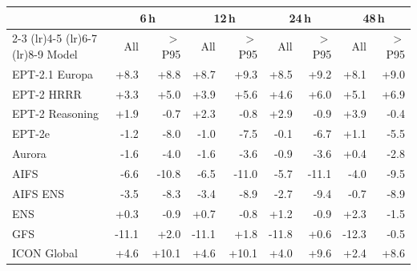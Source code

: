 \begin{tabular}{@{}l*{8}{r}@{}}
\toprule
& \multicolumn{2}{c}{6\,h} & \multicolumn{2}{c}{12\,h} & \multicolumn{2}{c}{24\,h} & \multicolumn{2}{c}{48\,h} \\
\cmidrule(lr){2-3} \cmidrule(lr){4-5} \cmidrule(lr){6-7} \cmidrule(lr){8-9}
Model & All & $>$P95 & All & $>$P95 & All & $>$P95 & All & $>$P95 \\
\midrule
EPT-2.1 Europa & +8.3 & +8.8 & +8.7 & +9.3 & +8.5 & +9.2 & +8.1 & +9.0 \\\addlinespace[0.3em]
EPT-2 HRRR & +3.3 & +5.0 & +3.9 & +5.6 & +4.6 & +6.0 & +5.1 & +6.9 \\\addlinespace[0.3em]
EPT-2 Reasoning & +1.9 & -0.7 & +2.3 & -0.8 & +2.9 & -0.9 & +3.9 & -0.4 \\\addlinespace[0.3em]
EPT-2e & -1.2 & -8.0 & -1.0 & -7.5 & -0.1 & -6.7 & +1.1 & -5.5 \\\addlinespace[0.3em]
Aurora & -1.6 & -4.0 & -1.6 & -3.6 & -0.9 & -3.6 & +0.4 & -2.8 \\\addlinespace[0.3em]
AIFS & -6.6 & -10.8 & -6.5 & -11.0 & -5.7 & -11.1 & -4.0 & -9.5 \\\addlinespace[0.3em]
AIFS ENS & -3.5 & -8.3 & -3.4 & -8.9 & -2.7 & -9.4 & -0.7 & -8.9 \\\addlinespace[0.3em]
ENS & +0.3 & -0.9 & +0.7 & -0.8 & +1.2 & -0.9 & +2.3 & -1.5 \\\addlinespace[0.3em]
GFS & -11.1 & +2.0 & -11.1 & +1.8 & -11.8 & +0.6 & -12.3 & -0.5 \\\addlinespace[0.3em]
ICON Global & +4.6 & +10.1 & +4.6 & +10.1 & +4.0 & +9.6 & +2.4 & +8.6 \\
\bottomrule
\end{tabular}
